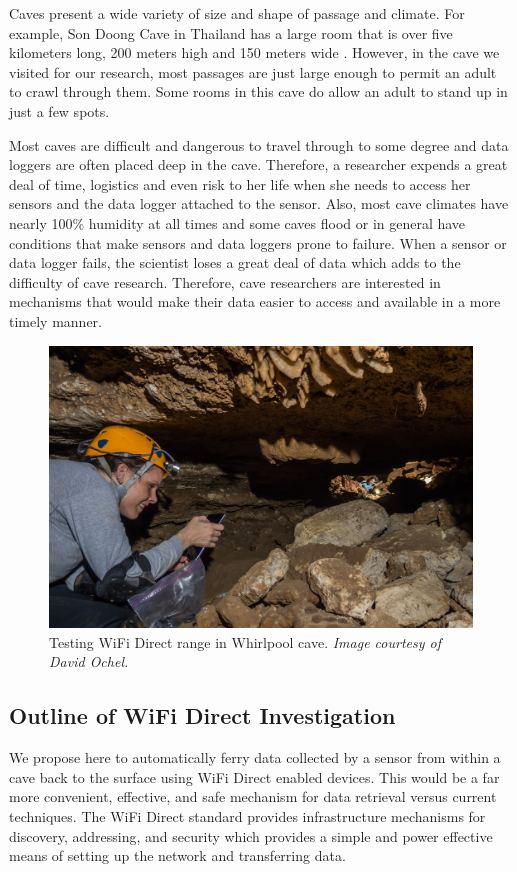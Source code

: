 \documentclass[10pt,twocolumn]{article}
\begin{document}
Caves present a wide variety of size and shape of passage and climate. 
For example, Son Doong Cave in Thailand has a large room that is over five kilometers long, 200 meters high and 150 meters wide \cite{sondoong}.
However, in the cave we visited for our research, most passages are just large enough to permit an adult to crawl through them.
Some rooms in this cave do allow an adult to stand up in just a few spots.

Most caves are difficult and dangerous to travel through to some degree and data loggers are often placed deep in the cave.
Therefore, a researcher expends a great deal of time, logistics and even risk to her life when she needs to access her sensors and the data logger attached to the sensor.
Also, most cave climates have nearly 100\% humidity at all times and some caves flood or in general have conditions that make sensors and data loggers prone to failure.
When a sensor or data logger fails, the scientist loses a great deal of data which adds to the difficulty of cave research.
Therefore, cave researchers are interested in mechanisms that would make their data easier to access and available in a more timely manner.

\begin{figure}[t]
\includegraphics[width=\textwidth]{cavewifi2}
\caption{Testing WiFi Direct range in Whirlpool cave. \textit{Image courtesy of David Ochel.}}
\end{figure}

\subsection{Outline of WiFi Direct Investigation}
\label{sec:Outline}
We propose here to automatically ferry data collected by a sensor from within a cave back to the surface using WiFi Direct enabled devices. 
This would be a far more convenient, effective, and safe mechanism for data retrieval versus current techniques.  
The WiFi Direct standard provides infrastructure mechanisms for discovery, addressing, and security which 
provides a simple and power effective means of setting up the network and transferring data. 
\end{document}
